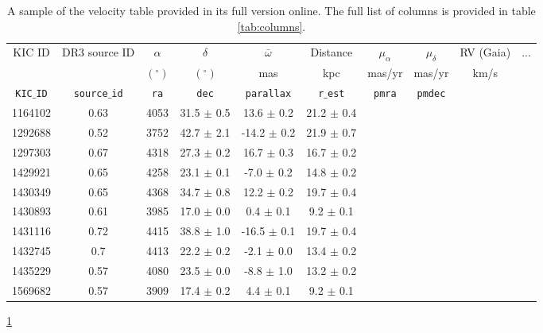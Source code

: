 \begin{table}[h!]
  \begin{center}
      \caption{
A sample of the velocity table provided in its full version online.
      The full list of columns is provided in table \ref{tab:columns}.
      }
    \label{tab:data}
\begin{tabular}{cccccccccc}
    KIC ID & DR3 source ID & $\alpha$ & $\delta$ & $\bar{\omega}$
    & Distance & $\mu_{\alpha}$ & $\mu_\delta$ & RV (Gaia) & ... \\
    & & $(^\circ)$ & $(^\circ)$ & mas & kpc & mas/yr & mas/yr & km/s & \\
    {\tt KIC$\_$ID} & {\tt source$\_$id} & {\tt ra} & {\tt dec} &
    {\tt parallax} & {\tt r$\_$est} & {\tt pmra} & {\tt pmdec} \\
\hline
1164102 & 0.63 & 4053 & 31.5 $\pm$ 0.5 & 13.6 $\pm$ 0.2 & 21.2 $\pm$ 0.4 \\
1292688 & 0.52 & 3752 & 42.7 $\pm$ 2.1 & -14.2 $\pm$ 0.2 & 21.9 $\pm$ 0.7 \\
1297303 & 0.67 & 4318 & 27.3 $\pm$ 0.2 & 16.7 $\pm$ 0.3 & 16.7 $\pm$ 0.2 \\
1429921 & 0.65 & 4258 & 23.1 $\pm$ 0.1 & -7.0 $\pm$ 0.2 & 14.8 $\pm$ 0.2 \\
1430349 & 0.65 & 4368 & 34.7 $\pm$ 0.8 & 12.2 $\pm$ 0.2 & 19.7 $\pm$ 0.4 \\
1430893 & 0.61 & 3985 & 17.0 $\pm$ 0.0 & 0.4 $\pm$ 0.1 & 9.2 $\pm$ 0.1 \\
1431116 & 0.72 & 4415 & 38.8 $\pm$ 1.0 & -16.5 $\pm$ 0.1 & 19.7 $\pm$ 0.4 \\
1432745 & 0.7 & 4413 & 22.2 $\pm$ 0.2 & -2.1 $\pm$ 0.0 & 13.4 $\pm$ 0.2 \\
1435229 & 0.57 & 4080 & 23.5 $\pm$ 0.0 & -8.8 $\pm$ 1.0 & 13.2 $\pm$ 0.2 \\
1569682 & 0.57 & 3909 & 17.4 $\pm$ 0.2 & 4.4 $\pm$ 0.1 & 9.2 $\pm$ 0.1 \\
\end{tabular}
\end{center}
\ref{tab:data}
\end{table}
